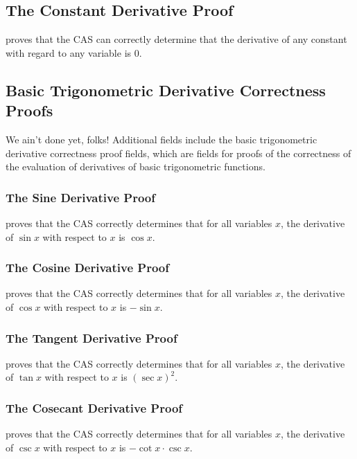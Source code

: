 \documentclass{report}
\begin{document}
\subsection{The Constant Derivative Proof}
  proves that the  CAS can correctly determine that the derivative of any constant with regard to any variable is \(0\).

\subsection{Basic Trigonometric Derivative Correctness Proofs}
We ain't done yet, folks!  Additional fields include the basic trigonometric derivative correctness proof fields, which are fields for proofs of the correctness of the evaluation of derivatives of basic trigonometric functions.

\subsubsection{The Sine Derivative Proof}
  proves that the  CAS correctly determines that for all variables \(x\), the derivative of \(\sin x\) with respect to \(x\) is \(\cos x\).

\subsubsection{The Cosine Derivative Proof}
  proves that the  CAS correctly determines that for all variables \(x\), the derivative of \(\cos x\) with respect to \(x\) is \(- \sin x\).

\subsubsection{The Tangent Derivative Proof}
  proves that the  CAS correctly determines that for all variables \(x\), the derivative of \(\tan x\) with respect to \(x\) is \(\left(\sec x\right)^2\).

\subsubsection{The Cosecant Derivative Proof}
  proves that the  CAS correctly determines that for all variables \(x\), the derivative of \(\csc x\) with respect to \(x\) is \(- \cot x \cdot \csc x\).
\end{document}
